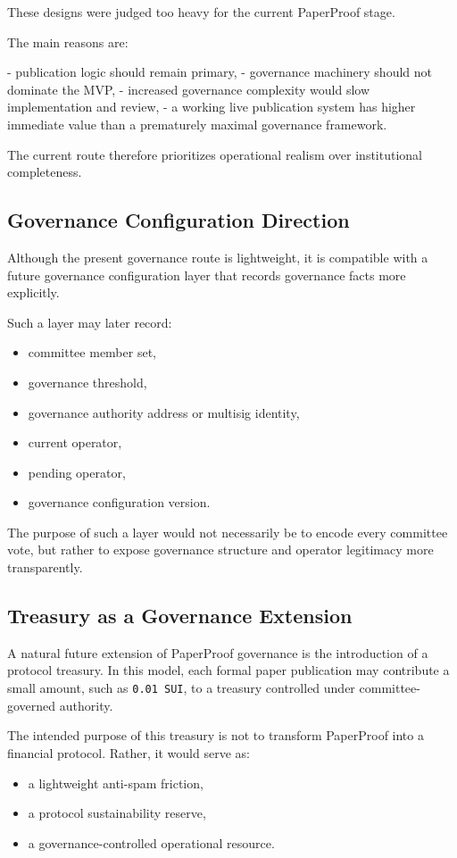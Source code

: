 \documentclass[journal]{IEEEtran}
\begin{document}
These designs were judged too heavy for the current PaperProof stage.

The main reasons are:

- publication logic should remain primary,
- governance machinery should not dominate the MVP,
- increased governance complexity would slow implementation and review,
- a working live publication system has higher immediate value than a prematurely maximal governance framework.

The current route therefore prioritizes operational realism over institutional completeness.

\subsection{Governance Configuration Direction}

Although the present governance route is lightweight, it is compatible with a future governance configuration layer that records governance facts more explicitly.

Such a layer may later record:
\begin{itemize}
    \item committee member set,
    \item governance threshold,
    \item governance authority address or multisig identity,
    \item current operator,
    \item pending operator,
    \item governance configuration version.
\end{itemize}


The purpose of such a layer would not necessarily be to encode every committee vote, but rather to expose governance structure and operator legitimacy more transparently.

\subsection{Treasury as a Governance Extension}

A natural future extension of PaperProof governance is the introduction of a protocol treasury. In this model, each formal paper publication may contribute a small amount, such as \texttt{0.01 SUI}, to a treasury controlled under committee-governed authority.

The intended purpose of this treasury is not to transform PaperProof into a financial protocol. Rather, it would serve as:
\begin{itemize}
    \item a lightweight anti-spam friction,
    \item a protocol sustainability reserve,
    \item a governance-controlled operational resource.
\end{itemize}
\end{document}
